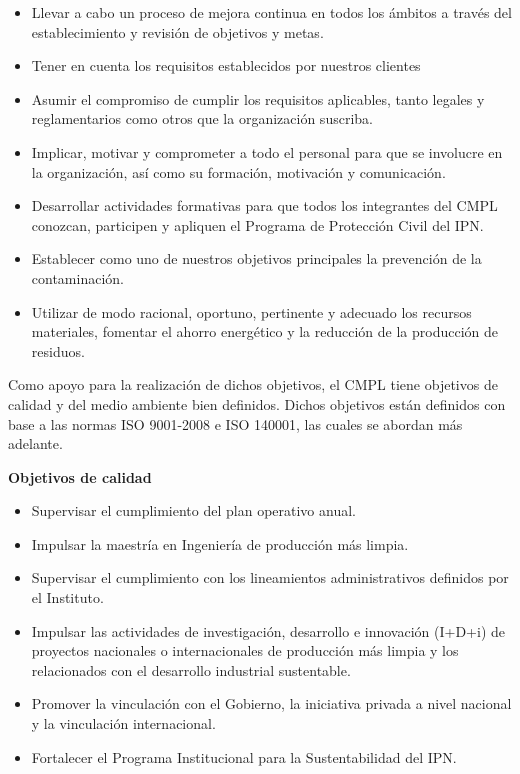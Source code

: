 	\begin{itemize}
		\item Llevar a cabo un proceso de mejora continua en todos los ámbitos a través del establecimiento y revisión de objetivos y metas.
		\item Tener en cuenta los requisitos establecidos por nuestros clientes
		\item Asumir el compromiso de cumplir los requisitos aplicables, tanto legales y reglamentarios como otros que la organización suscriba.
		\item Implicar, motivar y comprometer a todo el personal para que se involucre en la organización, así como su formación, motivación y comunicación.
		\item Desarrollar actividades formativas para que todos los integrantes del CMPL conozcan, participen y apliquen el Programa de Protección Civil del IPN.
		\item Establecer como uno de nuestros objetivos principales la prevención de la contaminación. 	\item Utilizar de modo racional, oportuno, pertinente y adecuado los recursos materiales, fomentar el ahorro energético y la reducción de la producción de residuos. 
	\end{itemize}

	Como apoyo para la realización de dichos objetivos, el CMPL tiene objetivos de calidad y del medio ambiente bien definidos. Dichos objetivos están definidos con base a las normas ISO 9001-2008 e ISO 140001, las cuales se abordan más adelante.

\textbf{Objetivos de calidad}

\begin{itemize}
	\item Supervisar el cumplimiento del plan operativo anual.
	\item Impulsar la maestría en Ingeniería de producción más limpia.
	\item Supervisar el cumplimiento con los lineamientos administrativos definidos por el Instituto.
	\item Impulsar las actividades de investigación, desarrollo e innovación (I+D+i) de proyectos nacionales o internacionales de producción más limpia y los relacionados con el desarrollo industrial sustentable.
 \item Promover la vinculación con el Gobierno, la iniciativa privada a nivel nacional y la vinculación internacional.
	\item Fortalecer el Programa Institucional para la Sustentabilidad del IPN.
\end{itemize}

